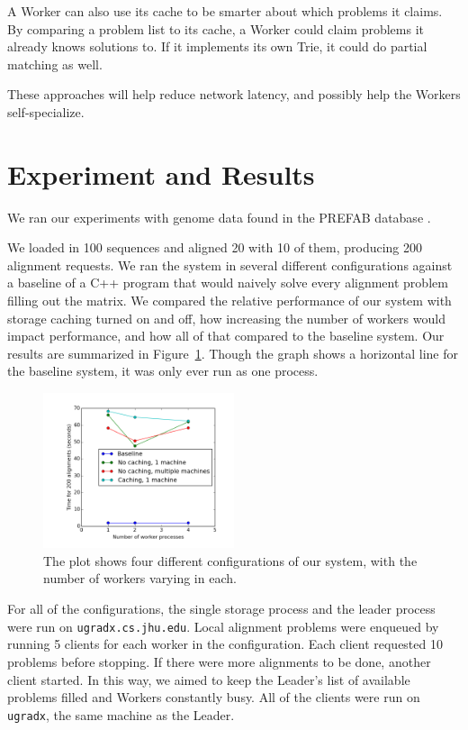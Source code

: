 \documentclass[12pt]{article}
\begin{document}
A Worker can also use its cache to be smarter about which problems it claims. By comparing a problem list to its cache, a Worker could claim problems it already knows solutions to. If it implements its own Trie, it could do partial matching as well.

These approaches will help reduce network latency, and possibly help the Workers self-specialize.


\section{Experiment and Results}

We ran our experiments with genome data found in the PREFAB database \cite{Edgar:04}.

We loaded in 100 sequences and aligned 20 with 10 of them, producing 200 alignment requests. We ran the system in  several different configurations against a baseline of a C++ program that would naively solve every alignment problem filling out the matrix. We compared the relative performance of our system with storage caching turned on and off, how increasing the number of workers would impact performance, and how all of that compared to the baseline system.
Our results are summarized in Figure~\ref{fig:benchmarks}.
Though the graph shows a horizontal line for the baseline system, it was only ever run as one process.

\begin{figure}
  \centering 
  \includegraphics[width=0.5\textwidth]{benchmarks}
  \caption{The plot shows four different configurations of our system, with the number of workers varying in each.}
  \label{fig:benchmarks}
\end{figure}

For all of the configurations, the single storage process and the leader process were run on \verb!ugradx.cs.jhu.edu!.
Local alignment problems were enqueued by running 5 clients for each worker in the configuration.
Each client requested 10 problems before stopping.
If there were more alignments to be done, another client started.
In this way, we aimed to keep the Leader's list of available problems filled and Workers constantly busy.
All of the clients were run on \verb!ugradx!, the same machine as the Leader.
\end{document}
